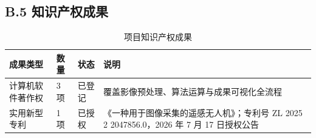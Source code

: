\subsection{B.5 知识产权成果}

\begin{table}[htbp]
    \centering
    \caption{项目知识产权成果}
    \label{tab:ip}
    \small
    \begin{tabular}{|p{3.4cm}|p{2.0cm}|p{3.0cm}|p{6.0cm}|}
        \hline
        \textbf{成果类型} & \textbf{数量} & \textbf{状态} & \textbf{说明} \\
        \hline
        计算机软件著作权 & 3 项 & 已登记 & 覆盖影像预处理、算法运算与成果可视化全流程 \\
        \hline
        实用新型专利 & 1 项 & 已授权 & 《一种用于图像采集的遥感无人机》；专利号 ZL 2025 2 2047856.0，2026 年 7 月 17 日授权公告 \\
        \hline
    \end{tabular}
\end{table}

